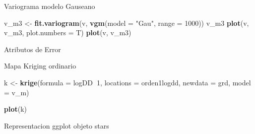 \documentclass[11pt,]{article}
\newenvironment{Shaded}{\begin{snugshade}}{\end{snugshade}}
\newcommand{\KeywordTok}[1]{\textcolor[rgb]{0.13,0.29,0.53}{\textbf{#1}}}
\newcommand{\DataTypeTok}[1]{\textcolor[rgb]{0.13,0.29,0.53}{#1}}
\newcommand{\DecValTok}[1]{\textcolor[rgb]{0.00,0.00,0.81}{#1}}
\newcommand{\StringTok}[1]{\textcolor[rgb]{0.31,0.60,0.02}{#1}}
\newcommand{\CommentTok}[1]{\textcolor[rgb]{0.56,0.35,0.01}{\textit{#1}}}
\newcommand{\OperatorTok}[1]{\textcolor[rgb]{0.81,0.36,0.00}{\textbf{#1}}}
\newcommand{\NormalTok}[1]{#1}
\begin{document}
Variograma modelo Gauseano

\begin{Shaded}
\begin{Highlighting}[]
\NormalTok{v_m3 <-}\StringTok{ }\KeywordTok{fit.variogram}\NormalTok{(v, }\KeywordTok{vgm}\NormalTok{(}\DataTypeTok{model =} \StringTok{"Gau"}\NormalTok{, }\DataTypeTok{range =} \DecValTok{1000}\NormalTok{))}
\NormalTok{v_m3}
\KeywordTok{plot}\NormalTok{(v, v_m3, }\DataTypeTok{plot.numbers =}\NormalTok{ T)}
\KeywordTok{plot}\NormalTok{(v, v_m3)}
\end{Highlighting}
\end{Shaded}

Atributos de Error

\begin{Shaded}
\end{Shaded}

Mapa Kriging ordinario

\begin{Shaded}
\begin{Highlighting}[]
\NormalTok{k <-}\StringTok{ }\KeywordTok{krige}\NormalTok{(}\DataTypeTok{formula =}\NormalTok{ logDD}\OperatorTok{~}\DecValTok{1}\NormalTok{, }\DataTypeTok{locations =}\NormalTok{ orden1logdd, }\DataTypeTok{newdata =}\NormalTok{ grd, }\DataTypeTok{model =}\NormalTok{ v_m)}

\KeywordTok{plot}\NormalTok{(k)}
\end{Highlighting}
\end{Shaded}

Representacion ggplot objeto stars
\end{document}
